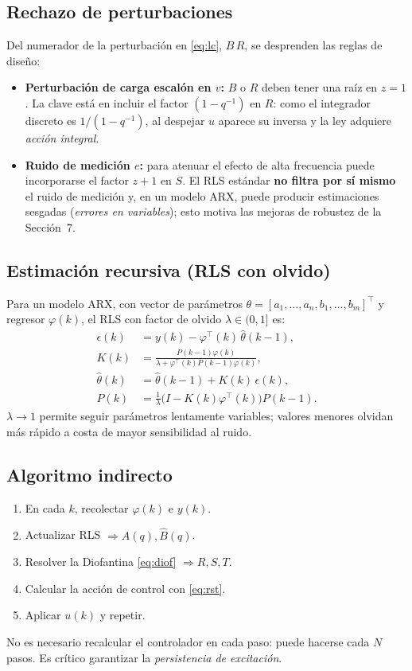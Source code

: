 \documentclass[a4paper,11pt]{report}
\begin{document}
\subsection{Rechazo de perturbaciones}

Del numerador de la perturbación en \eqref{eq:lc}, $B\,R$, se desprenden las
reglas de diseño:
\begin{itemize}[nosep]
  \item \textbf{Perturbación de carga escalón en $v$:} $B$ o $R$ deben tener una
  raíz en $z=1$. La clave está en incluir el factor $(1-q^{-1})$ en $R$: como el
  integrador discreto es $1/(1-q^{-1})$, al despejar $u$ aparece su inversa y la
  ley adquiere \emph{acción integral}.
  \item \textbf{Ruido de medición $e$:} para atenuar el efecto de alta frecuencia
  puede incorporarse el factor $z+1$ en $S$. El RLS estándar \textbf{no filtra
  por sí mismo} el ruido de medición y, en un modelo ARX, puede producir
  estimaciones sesgadas (\emph{errores en variables}); esto motiva las mejoras de
  robustez de la Sección~7.
\end{itemize}

\subsection{Estimación recursiva (RLS con olvido)}

Para un modelo ARX, con vector de parámetros
$\theta = [a_1,\dots,a_n, b_1,\dots,b_m]^\top$ y regresor $\varphi(k)$, el RLS
con factor de olvido $\lambda \in (0,1]$ es:
\begin{align}
  \epsilon(k) &= y(k) - \varphi^\top(k)\,\hat\theta(k-1), \\
  K(k) &= \frac{P(k-1)\varphi(k)}{\lambda + \varphi^\top(k)P(k-1)\varphi(k)}, \\
  \hat\theta(k) &= \hat\theta(k-1) + K(k)\,\epsilon(k), \\
  P(k) &= \tfrac{1}{\lambda}\big(I - K(k)\varphi^\top(k)\big)P(k-1).
\end{align}
$\lambda \to 1$ permite seguir parámetros lentamente variables; valores menores
olvidan más rápido a costa de mayor sensibilidad al ruido.

\subsection{Algoritmo indirecto}

\begin{enumerate}[nosep]
  \item En cada $k$, recolectar $\varphi(k)$ e $y(k)$.
  \item Actualizar RLS $\Rightarrow \hat A(q), \hat B(q)$.
  \item Resolver la Diofantina \eqref{eq:diof} $\Rightarrow R, S, T$.
  \item Calcular la acción de control con \eqref{eq:rst}.
  \item Aplicar $u(k)$ y repetir.
\end{enumerate}
No es necesario recalcular el controlador en cada paso: puede hacerse cada $N$
pasos. Es crítico garantizar la \emph{persistencia de excitación}.
\end{document}
